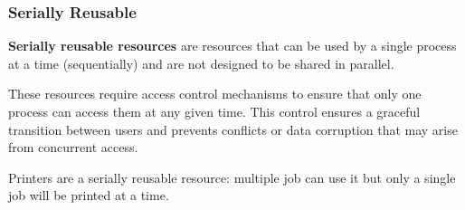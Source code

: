 \documentclass{article}
\begin{document}
\subsubsection{Serially Reusable}
\begin{tcolorbox}[title=Definition: Serially Reusable Resource]
  \textbf{Serially reusable resources} are resources that can be used by a single process at a time
  (sequentially) and are not designed to be shared in parallel.
\end{tcolorbox}
These resources require access control mechanisms to ensure that only one process can access them at
any given time. This control ensures a graceful transition between users and prevents conflicts or
data corruption that may arise from concurrent access.

\begin{tcolorbox}[colback=blue!5!white,colframe=black!75!blue,title=Example: Printing Process]
  Printers are a serially reusable resource: multiple job can use it but only a single job will be
  printed at a time. 
\end{tcolorbox}


\subsubsection{}
\subsubsection{}
\end{document}
